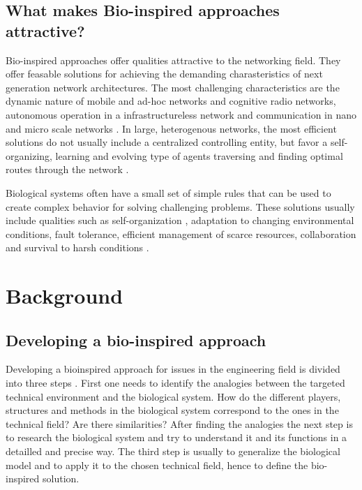 \documentclass{IWORK2014}
\begin{document}
\subsection{What makes Bio-inspired approaches attractive?} 
Bio-inspired approaches offer qualities attractive to the networking field. They offer feasable solutions for achieving the demanding charasteristics of next generation network architectures. The most challenging characteristics are the dynamic nature of mobile and ad-hoc networks and cognitive radio networks, autonomous operation in a infrastructureless network and communication in nano and micro scale networks \cite{dressler2010bio}. In large, heterogenous networks, the most efficient solutions do not usually include a centralized controlling entity, but favor a self-organizing, learning and evolving type of agents traversing and finding optimal routes through the network \cite{dressler2010bio}.

Biological systems often have a small set of simple rules that can be used to create complex behavior \cite{dressler2010bio} for solving challenging problems. These solutions usually include qualities such as self-organization \cite{kroeker2011biology}, adaptation to changing environmental conditions, fault tolerance, efficient management of scarce resources, collaboration and survival to harsh conditions \cite{dressler2010bio}.

\section{Background}

\subsection{Developing a bio-inspired approach}
Developing a bioinspired approach for issues in the engineering field is divided into three steps \cite{dressler2010bio}. First one needs to identify the analogies between the targeted technical environment and the biological system. How do the different players, structures and methods in the biological system correspond to the ones in the technical field? Are there similarities? After finding the analogies the next step is to research the biological system and try to understand it and its functions in a detailled and precise way. The third step is usually to generalize the biological model and to apply it to the chosen technical field, hence to define the bio-inspired solution.
\end{document}
